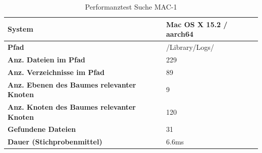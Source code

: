 \documentclass[a4paper,12pt]{report}
\begin{document}
    \begin{table}[h!]
        \centering
        \setlength{\leftmargini}{0.8cm}
        \begin{tabular}{|p{7cm}|p{5cm}|}
            \hline
            \textbf{System}                                            & Mac OS X 15.2 / aarch64 \\ \hline
            \textbf{Pfad}                                              & /Library/Logs/          \\ \hline
            \textbf{Anz. Dateien im Pfad}                              & 229                     \\ \hline
            \textbf{Anz. Verzeichnisse im Pfad}                        & 89                      \\ \hline
            \textbf{Anz. Ebenen \newline des Baumes relevanter Knoten} & 9                       \\ \hline
            \textbf{Anz. Knoten \newline des Baumes relevanter Knoten} & 120                     \\ \hline
            \textbf{Gefundene Dateien}                                 & 31                      \\ \hline
            \textbf{Dauer (Stichprobenmittel)}                        & 6.6ms                   \\ \hline
        \end{tabular}
        \caption{Performanztest Suche MAC-1}\label{tab:perf-search-mac-1}
    \end{table}
\end{document}
